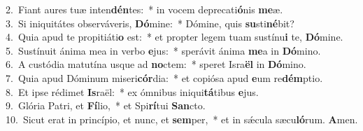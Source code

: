 {2.~}Fiant aures tuæ inten\textbf{dén}tes:~* in vocem deprecati\textbf{ó}nis \textbf{me}æ.\\
{3.~}Si iniquitátes observáveris, \textbf{Dó}mine:~* Dómine, quis \textbf{su}sti\textbf{né}bit?\\
{4.~}Quia apud te propitiáti\textbf{o} est:~* et propter legem tuam sustínu\textbf{i} te, \textbf{Dó}mine.\\
{5.~}Sustínuit ánima mea in verbo \textbf{e}jus:~* sperávit ánima \textbf{me}a in \textbf{Dó}mino.\\
{6.~}A custódia matutína usque ad \textbf{no}ctem:~* speret Isra\textbf{ël} in \textbf{Dó}mino.\\
{7.~}Quia apud Dóminum miseri\textbf{cór}dia:~* et copiósa apud \textbf{e}um re\textbf{dém}ptio.\\
{8.~}Et ipse rédimet \textbf{Is}raël:~* ex ómnibus iniqui\textbf{tá}tibus \textbf{e}jus.\\
{9.~}Glória Patri, et \textbf{Fí}lio,~* et Spi\textbf{rí}tui \textbf{San}cto.\\
{10.~}Sicut erat in princípio, et nunc, et \textbf{sem}per,~* et in sǽcula sæcu\textbf{ló}rum. \textbf{A}men.\\
